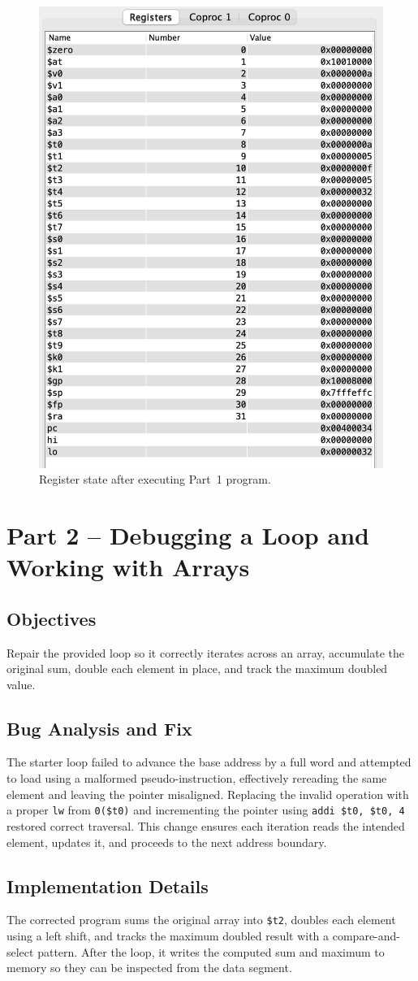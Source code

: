 \documentclass[11pt]{article}
\begin{document}
\begin{figure}[H]
  \centering
  \includegraphics[width=0.55\linewidth]{part1-register.png}
  \caption{Register state after executing Part~1 program.}
  \label{fig:part1}
\end{figure}

\newpage
\section{Part 2 -- Debugging a Loop and Working with Arrays}
\subsection*{Objectives}
Repair the provided loop so it correctly iterates across an array, accumulate the original sum, double each element in place, and track the maximum doubled value.

\subsection*{Bug Analysis and Fix}
The starter loop failed to advance the base address by a full word and attempted to load using a malformed pseudo-instruction, effectively rereading the same element and leaving the pointer misaligned. Replacing the invalid operation with a proper \texttt{lw} from \texttt{0(\$t0)} and incrementing the pointer using \texttt{addi \$t0, \$t0, 4} restored correct traversal. This change ensures each iteration reads the intended element, updates it, and proceeds to the next address boundary.

\subsection*{Implementation Details}
The corrected program sums the original array into \texttt{\$t2}, doubles each element using a left shift, and tracks the maximum doubled result with a compare-and-select pattern. After the loop, it writes the computed sum and maximum to memory so they can be inspected from the data segment.
\end{document}
